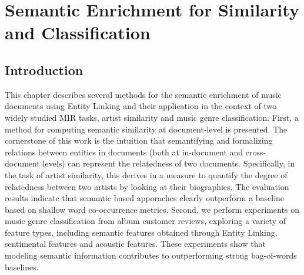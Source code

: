 

\chapter{Semantic Enrichment for Similarity and Classification}
\label{sec:similarity}

\section{Introduction}\label{sec:similarity:introduction} %

This chapter describes several methods for the semantic enrichment of music documents using Entity Linking and their application in the context of two widely studied MIR tasks, artist similarity and music genre classification. 
First, a method for computing semantic similarity at document-level is presented. The cornerstone of this work is the intuition that semantifying and formalizing relations between entities in documents (both at in-document and cross-document levels) can represent the relatedness of two documents. Specifically, in the task of artist similarity, this derives in a measure to quantify the degree of relatedness between two artists by looking at their biographies. The evaluation results indicate that semantic based apporaches clearly outperform a baseline based on shallow word co-occurrence metrics.
Second, we perform experiments on music genre classification from album customer reviews, exploring a variety of feature types, including semantic features obtained through Entity Linking, sentimental features  and acoustic features. These experiments show that modeling semantic information contributes to outperforming strong bag-of-words baselines. 

